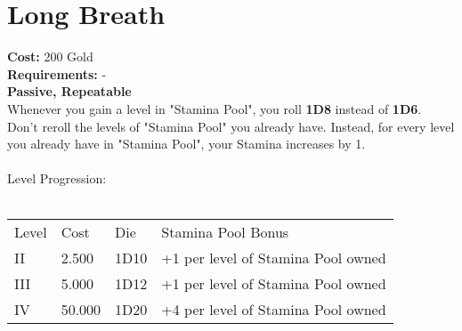 \section{Long Breath}\label{sec:longbreath}
\textbf{Cost:} 200 Gold\\
\textbf{Requirements:} -\\
\textbf{Passive, Repeatable}\\
Whenever you gain a level in "Stamina Pool", you roll \textbf{1D8} instead of \textbf{1D6}.
Don't reroll the levels of "Stamina Pool" you already have.
Instead, for every level you already have in "Stamina Pool", your Stamina increases by 1.\\
\\
Level Progression:\\
\\
\begin{tabular}{l | l | l | l}
    Level & Cost & Die & Stamina Pool Bonus\\
    II & 2.500 & 1D10 & +1 per level of Stamina Pool owned\\
    III & 5.000 & 1D12 & +1 per level of Stamina Pool owned\\
    IV & 50.000 & 1D20 & +4 per level of Stamina Pool owned\\
\end{tabular}

